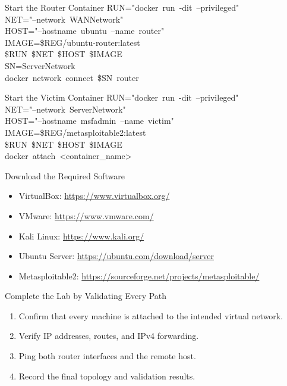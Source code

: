 \documentclass[aspectratio=169,11pt]{beamer}
\newcommand{\Cmd}[1]{{\color{CommandGreen}\ttfamily\fontsize{18}{22}\selectfont\mbox{#1}}}
\begin{document}
\begin{frame}{Start the Router Container}
  \Cmd{RUN="docker run -dit --privileged"}\\[0.25cm]
  \Cmd{NET="--network WANNetwork"}\\[0.25cm]
  \Cmd{HOST="--hostname ubuntu --name router"}\\[0.25cm]
  \Cmd{IMAGE=\$REG/ubuntu-router:latest}\\[0.25cm]
  \Cmd{\$RUN \$NET \$HOST \$IMAGE}\\[0.35cm]
  \Cmd{SN=ServerNetwork}\\[0.25cm]
  \Cmd{docker network connect \$SN router}
\end{frame}

\begin{frame}{Start the Victim Container}
  \Cmd{RUN="docker run -dit --privileged"}\\[0.25cm]
  \Cmd{NET="--network ServerNetwork"}\\[0.25cm]
  \Cmd{HOST="--hostname msfadmin --name victim"}\\[0.25cm]
  \Cmd{IMAGE=\$REG/metasploitable2:latest}\\[0.25cm]
  \Cmd{\$RUN \$NET \$HOST \$IMAGE}\\[0.35cm]
  \Cmd{docker attach <container\_name>}
\end{frame}

\begin{frame}{Download the Required Software}
  \begin{itemize}
    \item VirtualBox: \url{https://www.virtualbox.org/}
    \item VMware: \url{https://www.vmware.com/}
    \item Kali Linux: \url{https://www.kali.org/}
    \item Ubuntu Server: \url{https://ubuntu.com/download/server}
    \item Metasploitable2: \url{https://sourceforge.net/projects/metasploitable/}
  \end{itemize}
\end{frame}

\begin{frame}{Complete the Lab by Validating Every Path}
  \begin{enumerate}
    \item Confirm that every machine is attached to the intended virtual network.
    \item Verify IP addresses, routes, and IPv4 forwarding.
    \item Ping both router interfaces and the remote host.
    \item Record the final topology and validation results.
  \end{enumerate}
\end{frame}
\end{document}
